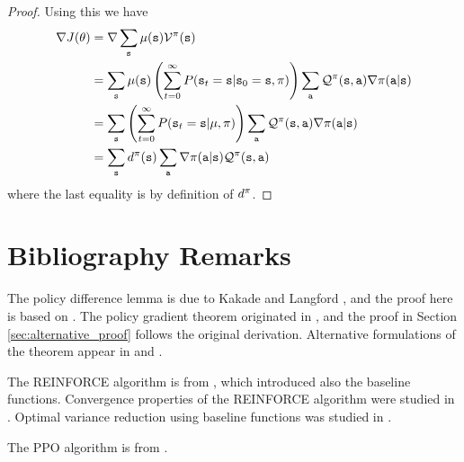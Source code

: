 \begin{proof}
Using this we have
\begin{align*}
\nabla J(\theta) &= \nabla \sum_{{\tt s}} \mu({\tt s}) \mathcal{V}^\pi ({\tt s})\\
&= \sum_{\tt s} \mu({\tt s}) \left(\sum_{t=0}^\infty P({\tt s}_t = {\tt s} | {\tt s}_0 = {\tt s}, \pi) \right) \sum_{\tt a} \mathcal{Q}^\pi ({\tt s},{\tt a}) \nabla\pi({\tt a}|{\tt s}) \\
&= \sum_{\tt s} \left(\sum_{t=0}^\infty P({\tt s}_t = {\tt s} | \mu, \pi) \right) \sum_{\tt a} \mathcal{Q}^\pi ({\tt s},{\tt a}) \nabla\pi({\tt a}|{\tt s}) \\
&= \sum_{\tt s} d^{\pi}({\tt s}) \sum_{\tt a} \nabla\pi({\tt a}|{\tt s}) \mathcal{Q}^\pi ({\tt s},{\tt a}) \\
\end{align*}
where the last equality is by definition of $d^{\pi}$.
\end{proof}




\section{Bibliography Remarks}
The policy difference lemma is due to Kakade and Langford \cite{kakade2002approximately}, and the proof here is based on \cite{scherrer2014local}. The policy gradient theorem originated in \cite{SuttonMSM99}, and the proof in Section \ref{sec:alternative_proof} follows the original derivation. Alternative formulations of the theorem appear in \cite{MarbachT01,MarbachT03} and \cite{BaxterB01}.

The REINFORCE algorithm is from \cite{Williams92}, which introduced also the baseline functions. Convergence properties of the REINFORCE algorithm were studied in \cite{PhansalkarT95}. Optimal variance reduction using baseline functions was studied in \cite{greensmith2004variance}.

The PPO algorithm is from \cite{schulman2017proximal}.






%


